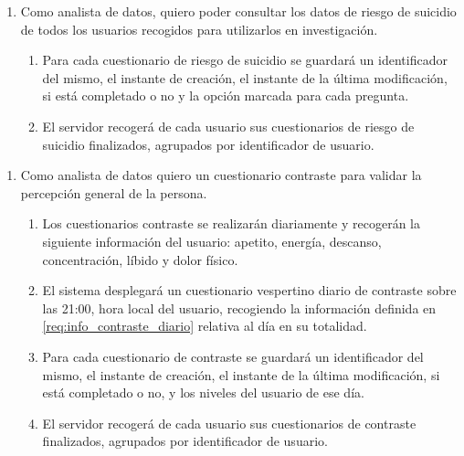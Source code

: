         \begin{enumerate}[resume=req-usuario,label=\textbf{\texttt{RU-\arabic*}}]
            \item Como analista de datos, quiero poder consultar los datos de riesgo de suicidio  de todos los usuarios recogidos para utilizarlos en investigación.
            \begin{enumerate}[resume=req-funcionales,label=\textbf{\texttt{RF-\arabic*}}]
                \item Para cada cuestionario de riesgo de suicidio se guardará un identificador del mismo, el instante de creación, el instante de la última modificación, si está completado o no y la opción marcada para cada pregunta.
                \item El servidor recogerá de cada usuario sus cuestionarios de riesgo de suicidio finalizados, agrupados por identificador de usuario.
            \end{enumerate}
        \end{enumerate}
        \begin{enumerate}[resume=req-usuario,label=\textbf{\texttt{RU-\arabic*}}]
            \item Como analista de datos quiero un cuestionario contraste para validar la percepción general de la persona.
            \begin{enumerate}[resume=req-funcionales,label=\textbf{\texttt{RF-\arabic*}}]
                \item \label{req:info_contraste_diario} Los cuestionarios contraste se realizarán diariamente y recogerán la siguiente información del usuario: apetito, energía, descanso, concentración, líbido y dolor físico. 
                \item El sistema desplegará un cuestionario vespertino diario de contraste sobre las 21:00, hora local del usuario, recogiendo la información definida en \ref{req:info_contraste_diario} relativa al día en su totalidad.
                \item Para cada cuestionario de contraste se guardará un identificador del mismo, el instante de creación, el instante de la última modificación, si está completado o no, y los niveles del usuario de ese día.
                \item El servidor recogerá de cada usuario sus cuestionarios de contraste finalizados, agrupados por identificador de usuario.
            \end{enumerate}
        \end{enumerate}
